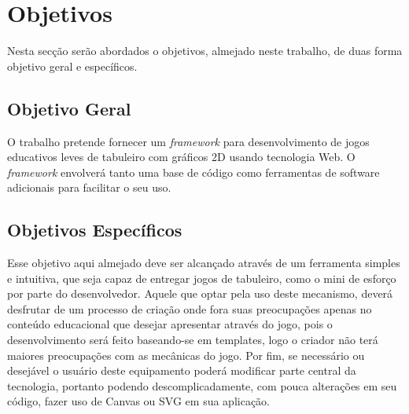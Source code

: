 \section{Objetivos}

Nesta secção serão abordados o objetivos, almejado neste trabalho, de duas forma objetivo geral e específicos.

\subsection{Objetivo Geral}

O trabalho pretende fornecer um \textit{framework} para desenvolvimento de jogos educativos leves de tabuleiro com gráficos 2D usando tecnologia Web. O \textit{framework} envolverá tanto uma base de código como ferramentas de software adicionais para facilitar o seu uso.


\subsection{Objetivos Específicos}







Esse objetivo aqui almejado deve ser alcançado através de um ferramenta simples e intuitiva, que seja capaz de entregar jogos de tabuleiro, como o mini de esforço por parte do desenvolvedor. Aquele que optar pela uso deste mecanismo, deverá desfrutar de um processo de criação onde fora suas preocupações apenas no conteúdo educacional que desejar apresentar através do jogo, pois o desenvolvimento será feito baseando-se em templates, logo o criador não terá maiores preocupações com as mecânicas do jogo. Por fim, se necessário ou desejável o usuário deste equipamento poderá modificar parte central da tecnologia, portanto podendo descomplicadamente, com pouca alterações em seu código, fazer uso de Canvas ou SVG em sua aplicação.

